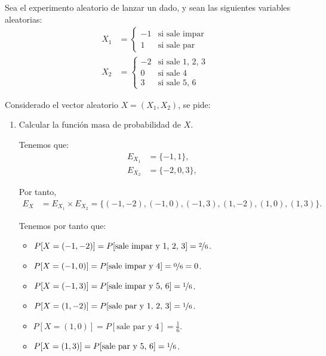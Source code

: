 \begin{ejemplo}
    Sea el experimento aleatorio de lanzar un dado, y sean las siguientes variables aleatorias:
    \begin{align*}
        X_1 &= \left\{
        \begin{array}{ll}
            -1 & \text{si sale impar} \\
            1 & \text{si sale par}
        \end{array}
        \right.\\
        X_2 &= \left\{
        \begin{array}{ll}
            -2 & \text{si sale 1, 2, 3} \\
            0 & \text{si sale 4} \\
            3 & \text{si sale 5, 6}
        \end{array}
        \right.
    \end{align*}

    Considerado el vector aleatorio $X=(X_1, X_2)$, se pide:
    \begin{enumerate}
        \item Calcular la función masa de probabilidad de $X$.
        
        Tenemos que:
        \begin{align*}
            E_{X_1} &= \{-1, 1\},\\
            E_{X_2} &= \{-2, 0, 3\},
        \end{align*}

        Por tanto,
        \begin{align*}
            E_X &= E_{X_1} \times E_{X_2} = \{(-1, -2), (-1, 0), (-1, 3), (1, -2), (1, 0), (1, 3)\}.
        \end{align*}

        Tenemos por tanto que:
        \begin{itemize}
            \item $P[X=(-1, -2)] = P[\text{sale impar y 1, 2, 3}] = \nicefrac{2}{6}$.
            \item $P[X=(-1, 0)] = P[\text{sale impar y 4}] = \nicefrac{0}{6}=0$.
            \item $P[X=(-1, 3)] = P[\text{sale impar y 5, 6}] = \nicefrac{1}{6}$.
            \item $P[X=(1, -2)] = P[\text{sale par y 1, 2, 3}] = \nicefrac{1}{6}$.
            \item $P[X=(1, 0)] = P[\text{sale par y 4}] = \frac{1}{6}$.
            \item $P[X=(1, 3)] = P[\text{sale par y 5, 6}] = \nicefrac{1}{6}$.
        \end{itemize}



\end{enumerate}
\end{ejemplo}
